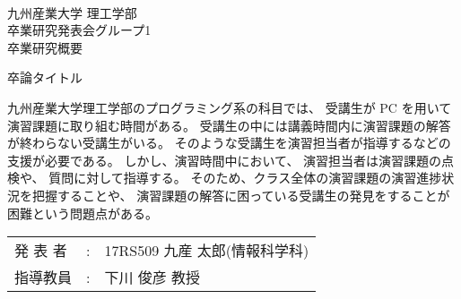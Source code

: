 \documentclass[uplatex,a4paper,12pt]{jsarticle}
\title
\renewcommand{\author}[1]{\def\author{#1}}
\renewcommand{\title}[1]{\def\title{#1}}
\newcommand{\supervisor}[1]{\def\supervisor{#1}}
\newcommand{\group}[1]{\def\group{#1}}
\newcommand{\makeheader}{
\newpage
\noindent\\九州産業大学 理工学部
\noindent\\卒業研究発表会グループ\group
\noindent\\卒業研究概要
\vskip 20mm
\begin{center}
  \title 
\end{center}
\vskip 15mm
}
\newcommand{\maketailer}{
\vskip 20mm
\begin{center}
\setlength{\tabcolsep}{1mm}
\begin{tabular}[h]{p{4zw}p{1em}l}
 発 表 者&:& \author (情報科学科)\\
 指導教員&:& \supervisor
\end{tabular}
\end{center}
}
\newenvironment{rsabst}{\makeheader}{\maketailer}
\begin{document}
\title{卒論タイトル}
\author{17RS509 九産 太郎}
\supervisor{下川 俊彦 教授}
\group{1}

\begin{rsabst}

九州産業大学理工学部のプログラミング系の科目では、
受講生が PC を用いて演習課題に取り組む時間がある。
受講生の中には講義時間内に演習課題の解答が終わらない受講生がいる。
そのような受講生を演習担当者が指導するなどの支援が必要である。
しかし、演習時間中において、
演習担当者は演習課題の点検や、
質問に対して指導する。
そのため、クラス全体の演習課題の演習進捗状況を把握することや、
演習課題の解答に困っている受講生の発見をすることが
困難という問題点がある。


\end{rsabst}
\end{document}
